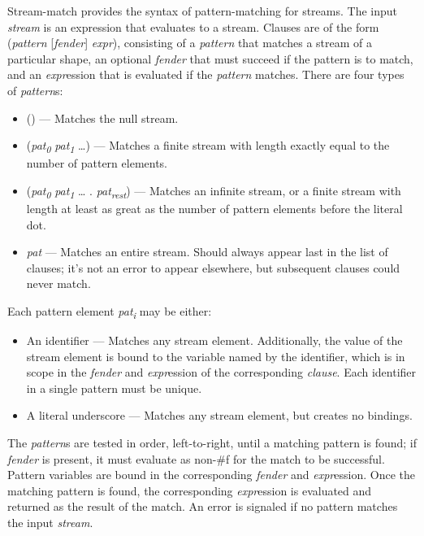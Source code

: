\begin{entry}{%
  }

  Stream-match provides the syntax of pattern-matching for
  streams. The input \emph{stream} is an expression that evaluates to
  a stream. Clauses are of the form (\emph{pattern}
  {[}\emph{fender}{]} \emph{expr}), consisting of a \emph{pattern}
  that matches a stream of a particular shape, an optional
  \emph{fender} that must succeed if the pattern is to match, and an
  \emph{expr}ession that is evaluated if the \emph{pattern}
  matches. There are four types of \emph{pattern}s:

\begin{itemize}
  \tightlist
\item () --- Matches the null stream.
\item (\emph{pat}\textsubscript{\emph{0}}
  \emph{pat}\textsubscript{\emph{1}} \ldots{}) --- Matches a finite
  stream with length exactly equal to the number of pattern elements.
\item (\emph{pat}\textsubscript{\emph{0}}
  \emph{pat}\textsubscript{\emph{1}} \ldots{}
  . \emph{pat}\textsubscript{\emph{rest}}) --- Matches an infinite
  stream, or a finite stream with length at least as great as the
  number of pattern elements before the literal dot.
\item \emph{pat} --- Matches an entire stream. Should always appear
  last in the list of clauses; it's not an error to appear elsewhere,
  but subsequent clauses could never match.
\end{itemize}

Each pattern element \emph{pat}\textsubscript{\emph{i}} may be either:

\begin{itemize}
  \tightlist
\item An identifier --- Matches any stream element. Additionally, the
  value of the stream element is bound to the variable named by the
  identifier, which is in scope in the \emph{fender} and
  \emph{expr}ession of the corresponding \emph{clause}. Each
  identifier in a single pattern must be unique.
\item A literal underscore --- Matches any stream element, but creates
  no bindings.
\end{itemize}

The \emph{pattern}s are tested in order, left-to-right, until a
matching pattern is found; if \emph{fender} is present, it must
evaluate as non-\#f for the match to be successful. Pattern variables
are bound in the corresponding \emph{fender} and
\emph{expr}ession. Once the matching pattern is found, the
corresponding \emph{expr}ession is evaluated and returned as the
result of the match. An error is signaled if no pattern matches the
input \emph{stream}.


\end{entry}
